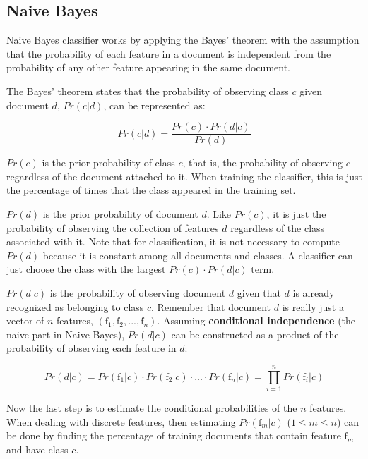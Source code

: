 \documentclass[12pt]{ucthesis}
\begin{document}
\subsection{Naive Bayes}
\label{background-classifiers-naive-bayes}
Naive Bayes classifier works by applying the Bayes' theorem with the assumption that
the probability of each feature in a document is independent from the probability of
any other feature appearing in the same document.\cite{Kibriya}\cite{Frank}

The Bayes' theorem states that the probability of observing class $c$ given document $d$, $Pr(c|d)$, can be represented as:

\begin{equation}
   Pr(c|d) = \frac{Pr(c) \cdot Pr(d|c)}{Pr(d)}
\end{equation}

$Pr(c)$ is the \textsf{prior probability} of class $c$, that is, the probability of
observing $c$ regardless of the document attached to it. When training the classifier, this
is just the percentage of times that the class appeared in the training set.

$Pr(d)$ is the \textsf{prior probability} of document $d$. Like $Pr(c)$, it is just the
probability of observing the collection of features $d$ regardless of the class associated with it.
Note that for classification, it is not necessary to compute $Pr(d)$ because it is constant among all
documents and classes. A classifier can just choose the class with the largest $Pr(c) \cdot Pr(d|c)$ term.

$Pr(d|c)$ is the probability of observing document $d$ given that $d$ is already recognized as belonging to
class $c$. Remember that document $d$ is really just a vector of $n$ features, $(\textrm{f}_{1}, \textrm{f}_{2}, ..., \textrm{f}_{n})$.
Assuming \textbf{conditional independence} (the \textsf{naive} part in Naive Bayes), $Pr(d|c)$ can be
constructed as a product of the probability of observing each feature in $d$:

\begin{equation}
   Pr(d|c) = Pr(\textrm{f}_{1}|c) \cdot Pr(\textrm{f}_{2}|c) \cdot ... \cdot Pr(\textrm{f}_{n}|c) = \prod_{i = 1}^{n}Pr(\textrm{f}_{i}|c)
\end{equation}

Now the last step is to estimate the conditional probabilities of the $n$ features.
When dealing with discrete features, then estimating $Pr(\textrm{f}_{m}|c)$ ($1 \leq m \leq n$) can be done by
finding the percentage of training documents that contain feature $\textrm{f}_{m}$ and have class $c$.
\end{document}
